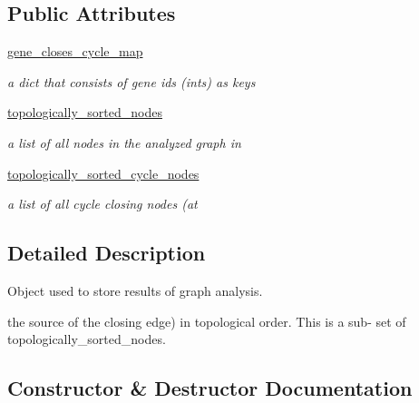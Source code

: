 \subsection*{Public Attributes}
\begin{DoxyCompactItemize}
\item 
\hyperlink{classNEAT__PyGenetics_1_1NEAT_1_1Analyst_1_1AnalysisResult_1_1AnalysisResult_a8ad8be788715b6298240055bbd835d5e}{gene\+\_\+closes\+\_\+cycle\+\_\+map}
\begin{DoxyCompactList}\small\item\em a dict that consists of gene id\textquotesingle{}s (ints) as keys \end{DoxyCompactList}\item 
\hyperlink{classNEAT__PyGenetics_1_1NEAT_1_1Analyst_1_1AnalysisResult_1_1AnalysisResult_a5dec17c624dfc418d21b543b366413e2}{topologically\+\_\+sorted\+\_\+nodes}
\begin{DoxyCompactList}\small\item\em a list of all nodes in the analyzed graph in \end{DoxyCompactList}\item 
\hyperlink{classNEAT__PyGenetics_1_1NEAT_1_1Analyst_1_1AnalysisResult_1_1AnalysisResult_acca98f28e97dddad4c4ee0c86d499e58}{topologically\+\_\+sorted\+\_\+cycle\+\_\+nodes}
\begin{DoxyCompactList}\small\item\em a list of all cycle closing nodes (at \end{DoxyCompactList}\end{DoxyCompactItemize}


\subsection{Detailed Description}
Object used to store results of graph analysis. 

the source of the closing edge) in topological order. This is a sub-\/ set of topologically\+\_\+sorted\+\_\+nodes. 

\subsection{Constructor \& Destructor Documentation}

